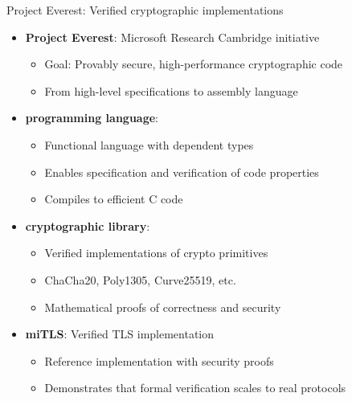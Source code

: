 \documentclass[aspectratio=169, lualatex, handout]{beamer}
\begin{document}
\begin{frame}{Project Everest: Verified cryptographic implementations}
	\begin{itemize}[<+->]
		\item \textbf{Project Everest}: Microsoft Research Cambridge initiative
		      \begin{itemize}
			      \item Goal: Provably secure, high-performance cryptographic code
			      \item From high-level specifications to assembly language
		      \end{itemize}
		\item \textbf{\fstar programming language}:
		      \begin{itemize}
			      \item Functional language with dependent types
			      \item Enables specification and verification of code properties
			      \item Compiles to efficient C code
		      \end{itemize}
		\item \textbf{\haclstar cryptographic library}:
		      \begin{itemize}
			      \item Verified implementations of crypto primitives
			      \item ChaCha20, Poly1305, Curve25519, etc.
			      \item Mathematical proofs of correctness and security
		      \end{itemize}
		\item \textbf{miTLS}: Verified TLS implementation
		      \begin{itemize}
			      \item Reference implementation with security proofs
			      \item Demonstrates that formal verification scales to real protocols
		      \end{itemize}
	\end{itemize}
\end{frame}
\end{document}
